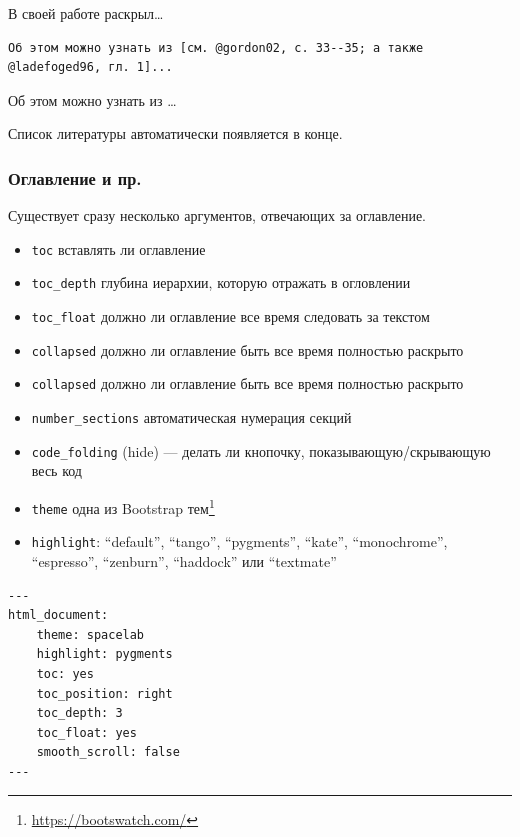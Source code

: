 \documentclass[
]{book}
\providecommand{\tightlist}{%
  \setlength{\itemsep}{0pt}\setlength{\parskip}{0pt}}
\renewcommand{\href}[2]{#2\footnote{\url{#1}}}
\begin{document}
В своей работе \citep{gordon02} раскрыл\ldots{}

\begin{verbatim}
Об этом можно узнать из [см. @gordon02, с. 33--35; а также @ladefoged96, гл. 1]...
\end{verbatim}

Об этом можно узнать из \citetext{\citealp[см.][с. 33--35]{gordon02}; \citealp[а также][гл. 1]{ladefoged96}}\ldots{}

Список литературы автоматически появляется в конце.

\hypertarget{ux43eux433ux43bux430ux432ux43bux435ux43dux438ux435-ux438-ux43fux440.}{%
\subsubsection{Оглавление и пр.}\label{ux43eux433ux43bux430ux432ux43bux435ux43dux438ux435-ux438-ux43fux440.}}

Существует сразу несколько аргументов, отвечающих за оглавление.

\begin{itemize}
\tightlist
\item
  \texttt{toc} вставлять ли оглавление
\item
  \texttt{toc\_depth} глубина иерархии, которую отражать в огловлении
\item
  \texttt{toc\_float} должно ли оглавление все время следовать за текстом
\item
  \texttt{collapsed} должно ли оглавление быть все время полностью раскрыто
\item
  \texttt{collapsed} должно ли оглавление быть все время полностью раскрыто
\item
  \texttt{number\_sections} автоматическая нумерация секций
\item
  \texttt{code\_folding} (hide) --- делать ли кнопочку, показывающую/скрывающую весь код
\item
  \texttt{theme} одна из \href{https://bootswatch.com/}{Bootstrap тем}
\item
  \texttt{highlight}: ``default'', ``tango'', ``pygments'', ``kate'', ``monochrome'', ``espresso'', ``zenburn'', ``haddock'' или ``textmate''
\end{itemize}

\begin{verbatim}
---
html_document:
    theme: spacelab
    highlight: pygments
    toc: yes
    toc_position: right
    toc_depth: 3
    toc_float: yes
    smooth_scroll: false
---
\end{verbatim}
\end{document}
